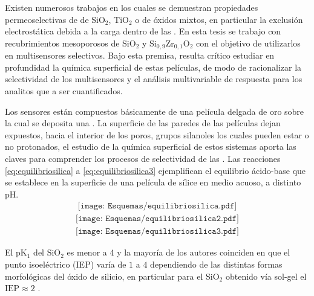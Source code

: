 	Existen numerosos trabajos en los cuales se demuestran propiedades permeoselectivas de \pdm\space de SiO$_2$, TiO$_2$ o de óxidos mixtos, en particular la exclusión electrostática debida a la carga dentro de las \pdm. \cite{walcarius2013,Andrieu-Brunsen2015,Etienne2013,Calvo2009,brunsen2011} En esta tesis se trabajo con recubrimientos mesoporosos de SiO$_2$ y Si$_{0,9}$Zr$_{0,1}$O$_2$ con el objetivo de utilizarlos en multisensores selectivos. Bajo esta premisa, resulta crítico estudiar en profundidad la química superficial de estas películas, de modo de racionalizar la selectividad de los multisensores y el análisis multivariable de respuesta para los analitos que a ser cuantificados. 

	Los sensores están compuestos básicamente de una película delgada de oro sobre la cual se deposita una \pdm. La superficie de las paredes de las películas dejan expuestos, hacia el interior de los poros, grupos silanoles los cuales pueden estar o no protonados, el estudio de la química superficial de estos sistemas aporta las claves para comprender los procesos de selectividad de las \pdm.\cite{Brinker1990,Soler-Illia2011} Las reacciones \ref{eq:equilibriosilica} a \ref{eq:equilibriosilica3} ejemplifican el equilibrio ácido-base que se establece en la superficie de una película de sílice en medio acuoso, a distinto pH.\cite{Lowe2015} 
			\begin{equation}
				\begin{aligned}
				\texttt{[image: Esquemas/equilibriosilica.pdf]}
				\label{eq:equilibriosilica}
				\end{aligned}
				\end{equation}
			\begin{equation}
				\begin{aligned}
				\texttt{[image: Esquemas/equilibriosilica2.pdf]}
				\end{aligned}
				\label{eq:equilibriosilica2}
				\end{equation}
			\begin{equation}
				\begin{aligned}
				\texttt{[image: Esquemas/equilibriosilica3.pdf]}
				\label{eq:equilibriosilica3}
				\end{aligned}
				\end{equation}		
     
     El pK$_{1}$ del $\text{SiO}_2$ es menor a 4 y la mayoría de los autores coinciden en que el punto isoeléctrico (IEP) varía de $1$ a $4$ dependiendo de  las distintas formas morfológicas del óxido de silicio, en particular para el SiO$_2$ obtenido vía sol-gel el $\text{IEP}\approx 2$ \cite{Kosmulski2002,Kosmulski2014,Schwarz1984,Si-HanWu2013}.
     
